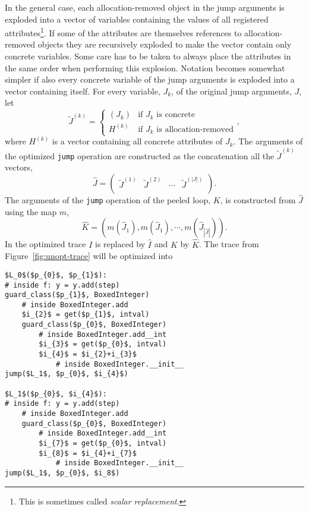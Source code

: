 \documentclass[preprint]{sigplanconf}
\begin{document}
In the general case, each allocation-removed object in the jump arguments is exploded into a
vector of variables containing the values of all registered
attributes\footnote{This is sometimes called \emph{scalar replacement}.}.
If some of the attributes are themselves references to
allocation-removed objects they are recursively exploded
to make the vector contain only concrete variables. Some care has
to be taken to always place the attributes in the same order when
performing this explosion. Notation becomes somewhat simpler if also every
concrete variable of the jump arguments is exploded into a vector containing
itself. For
every variable, $J_k$, of the original jump arguments, $J$, let
\begin{equation}
  \tilde J^{\left(k\right)} = \left\{
      \begin{array}{ll}
        \left(J_k\right)  & \text{if $J_k$ is concrete} \\
        H^{\left(k\right)} & \text{if $J_k$ is allocation-removed}
      \end{array}
  \right.
  ,
\end{equation}
where $H^{\left(k\right)}$ is a vector containing all concrete
attributes of $J_k$. The arguments of the optimized \lstinline{jump}
operation are constructed as the concatenation all the $\tilde J^{\left(k\right)}$ vectors,
\begin{equation}
  \hat J = \left( 
    \begin{array}{cccc}
      \tilde J^{\left(1\right)} & \tilde J^{\left(2\right)} & \cdots &
      \tilde J^{\left(|J|\right)} \\
    \end{array}
  \right)      
  .
\end{equation}
The arguments of the \lstinline{jump} operation of the peeled loop,
$K$, is constructed from $\hat J$ using the map $m$,
\begin{equation}
  \hat K = \left(m\left(\hat J_1\right), m\left(\hat J_1\right), 
                 \cdots, m\left(\hat J_{|\hat J|}\right)\right)
  .
\end{equation}
In the optimized trace $I$ is replaced by $\hat I$ and $K$ by $\hat
K$. The trace from Figure~\ref{fig:unopt-trace} will be optimized into

\begin{lstlisting}[mathescape,numbers = right,basicstyle=\setstretch{1.05}\ttfamily\scriptsize]
$L_0$($p_{0}$, $p_{1}$):
# inside f: y = y.add(step)
guard_class($p_{1}$, BoxedInteger)
    # inside BoxedInteger.add
    $i_{2}$ = get($p_{1}$, intval)
    guard_class($p_{0}$, BoxedInteger)
        # inside BoxedInteger.add__int
        $i_{3}$ = get($p_{0}$, intval)
        $i_{4}$ = $i_{2}+i_{3}$
            # inside BoxedInteger.__init__
jump($L_1$, $p_{0}$, $i_{4}$)

$L_1$($p_{0}$, $i_{4}$):
# inside f: y = y.add(step)
    # inside BoxedInteger.add
    guard_class($p_{0}$, BoxedInteger)
        # inside BoxedInteger.add__int
        $i_{7}$ = get($p_{0}$, intval)
        $i_{8}$ = $i_{4}+i_{7}$
            # inside BoxedInteger.__init__
jump($L_1$, $p_{0}$, $i_8$)
\end{lstlisting}
\end{document}
